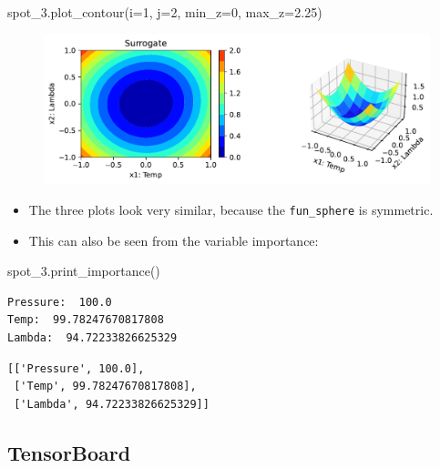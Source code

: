\documentclass[
  letterpaper,
  DIV=11,
  numbers=noendperiod]{scrreprt}
\newenvironment{Shaded}{\begin{snugshade}}{\end{snugshade}}
\newcommand{\DecValTok}[1]{\textcolor[rgb]{0.68,0.00,0.00}{#1}}
\newcommand{\FloatTok}[1]{\textcolor[rgb]{0.68,0.00,0.00}{#1}}
\newcommand{\NormalTok}[1]{\textcolor[rgb]{0.00,0.23,0.31}{#1}}
\newcommand{\OperatorTok}[1]{\textcolor[rgb]{0.37,0.37,0.37}{#1}}
\providecommand{\tightlist}{%
  \setlength{\itemsep}{0pt}\setlength{\parskip}{0pt}}\usepackage{longtable,booktabs,array}
\begin{document}
\begin{Shaded}
\begin{Highlighting}[]
\NormalTok{spot\_3.plot\_contour(i}\OperatorTok{=}\DecValTok{1}\NormalTok{, j}\OperatorTok{=}\DecValTok{2}\NormalTok{, min\_z}\OperatorTok{=}\DecValTok{0}\NormalTok{, max\_z}\OperatorTok{=}\FloatTok{2.25}\NormalTok{)}
\end{Highlighting}
\end{Shaded}

\begin{figure}[H]

{\centering \includegraphics{008_num_spot_multidim_files/figure-pdf/cell-10-output-1.pdf}

}

\end{figure}

\begin{itemize}
\tightlist
\item
  The three plots look very similar, because the \texttt{fun\_sphere} is
  symmetric.
\item
  This can also be seen from the variable importance:
\end{itemize}

\begin{Shaded}
\begin{Highlighting}[]
\NormalTok{spot\_3.print\_importance()}
\end{Highlighting}
\end{Shaded}

\begin{verbatim}
Pressure:  100.0
Temp:  99.78247670817808
Lambda:  94.72233826625329
\end{verbatim}

\begin{verbatim}
[['Pressure', 100.0],
 ['Temp', 99.78247670817808],
 ['Lambda', 94.72233826625329]]
\end{verbatim}

\hypertarget{tensorboard-3}{%
\subsection{TensorBoard}\label{tensorboard-3}}
\end{document}
